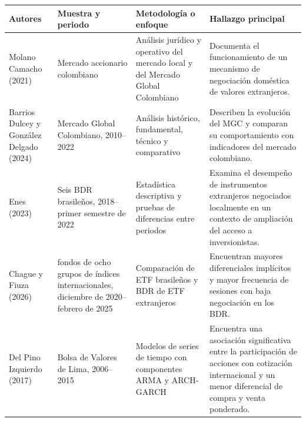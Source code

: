 {\small
\begin{longtable}[]{@{}
  >{\raggedright\arraybackslash}p{}
  >{\raggedright\arraybackslash}p{}
  >{\raggedright\arraybackslash}p{}
  >{\raggedright\arraybackslash}p{}@{}}
\toprule\noalign{}
\begin{minipage}[b]{\linewidth}\raggedright
\textbf{Autores}
\end{minipage} & \begin{minipage}[b]{\linewidth}\raggedright
\textbf{Muestra y periodo}
\end{minipage} & \begin{minipage}[b]{\linewidth}\raggedright
\textbf{Metodología o enfoque}
\end{minipage} & \begin{minipage}[b]{\linewidth}\raggedright
\textbf{Hallazgo principal}
\end{minipage} \\
\midrule\noalign{}
\endhead
\bottomrule\noalign{}
\endlastfoot
Molano Camacho (2021) & Mercado accionario colombiano & Análisis jurídico y operativo del mercado local y del Mercado Global Colombiano & Documenta el funcionamiento de un mecanismo de negociación doméstica de valores extranjeros. \\
Barrios Dulcey y González Delgado (2024) & Mercado Global Colombiano, 2010--2022 & Análisis histórico, fundamental, técnico y comparativo & Describen la evolución del MGC y comparan su comportamiento con indicadores del mercado colombiano. \\
Enes (2023) & Seis BDR brasileños, 2018--primer semestre de 2022 & Estadística descriptiva y pruebas de diferencias entre periodos & Examina el desempeño de instrumentos extranjeros negociados localmente en un contexto de ampliación del acceso a inversionistas. \\
Chague y Fiuza (2026) & 18 fondos de ocho grupos de índices internacionales, diciembre de 2020--febrero de 2025 & Comparación de ETF brasileños y BDR de ETF extranjeros & Encuentran mayores diferenciales implícitos y mayor frecuencia de sesiones con baja negociación en los BDR. \\
Del Pino Izquierdo (2017) & Bolsa de Valores de Lima, 2006--2015 & Modelos de series de tiempo con componentes ARMA y ARCH-GARCH & Encuentra una asociación significativa entre la participación de acciones con cotización internacional y un menor diferencial de compra y venta ponderado. \\

\end{longtable}}
